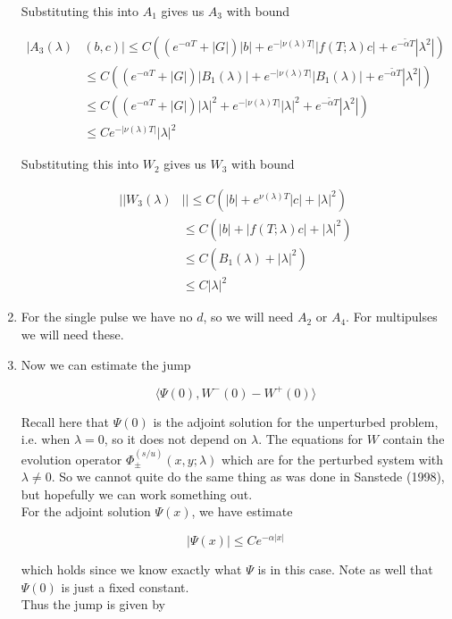 \documentclass[12pt]{article}
\begin{document}
\begin{enumerate}
Substituting this into $A_1$ gives us $A_3$ with bound

\begin{align*}
|A_3(\lambda)&(b, c)| \leq C ( (e^{-\alpha T} + |G|)|b| + e^{-|\nu(\lambda)T|}|f(T; \lambda) c| + e^{-\tilde{\alpha}T} |\lambda^2|) \\
&\leq C ( (e^{-\alpha T} + |G|)|B_1(\lambda)| + e^{-|\nu(\lambda)T|}|B_1(\lambda)| + e^{-\tilde{\alpha}T} |\lambda^2|) \\
&\leq C ( (e^{-\alpha T} + |G|)|\lambda|^2 + e^{-|\nu(\lambda)T|}|\lambda|^2 + e^{-\tilde{\alpha}T} |\lambda^2|) \\
&\leq C e^{-|\nu(\lambda)T|} |\lambda|^2
\end{align*}

Substituting this into $W_2$ gives us $W_3$ with bound

\begin{align*}
||W_3(\lambda)&|| \leq C (|b| + e^{\nu(\lambda)T}|c| + |\lambda|^2) \\
&\leq C (|b| + |f(T; \lambda) c| + |\lambda|^2) \\
&\leq C( B_1(\lambda) + |\lambda|^2)\\
&\leq C |\lambda|^2
\end{align*}

\item For the single pulse we have no $d$, so we will need $A_2$ or $A_4$. For multipulses we will need these.

\item Now we can estimate the jump

\[
\langle \Psi(0), W^-(0) - W^+(0) \rangle 
\]

Recall here that $\Psi(0)$ is the adjoint solution for the unperturbed problem, i.e. when $\lambda = 0$, so it does not depend on $\lambda$. The equations for $W$ contain the evolution operator $\Phi^{(s/u)}_\pm(x, y; \lambda)$ which are for the perturbed system with $\lambda \neq 0$. So we cannot quite do the same thing as was done in Sanstede (1998), but hopefully we can work something out.\\

For the adjoint solution $\Psi(x)$, we have estimate 

\[
|\Psi(x)| \leq C e^{-\alpha|x|}
\]

which holds since we know exactly what $\Psi$ is in this case. Note as well that $\Psi(0)$ is just a fixed constant.\\

Thus the jump is given by


\end{enumerate}
\end{document}
